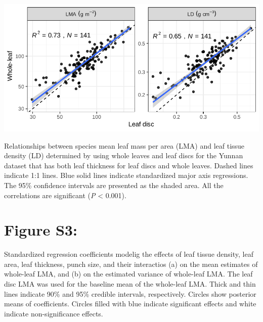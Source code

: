 \documentclass[
  12pt,
]{article}
\begin{document}
\includegraphics[width=6.25in,height=\textheight]{../figs/lma_ld.pdf}

Relationships between species mean leaf mass per area (LMA) and leaf tissue density (LD) determined by using whole leaves and leaf discs for the Yunnan dataset that has both leaf thickness for leaf discs and whole leaves.
Dashed lines indicate 1:1 lines.
Blue solid lines indicate standardized major axis regressions.
The 95\% confidence intervals are presented as the shaded area.
All the correlations are significant (\emph{P} \textless{} 0.001).

\newpage

\hypertarget{figure-s3}{%
\section{Figure S3:}\label{figure-s3}}

Standardized regression coefficients modelig the effects of leaf tissue density,
leaf area,
leaf thickness,
punch size, and
their interactios
(a) on the mean estimates of whole-leaf LMA, and
(b) on the estimated variance of whole-leaf LMA.
The leaf disc LMA was used for the baseline mean of the whole-leaf LMA.
Thick and thin lines indicate 90\% and 95\% credible intervals, respectively.
Circles show posterior means of coefficients.
Circles filled with blue indicate significant effects and white indicate non-significance effects.
\end{document}
